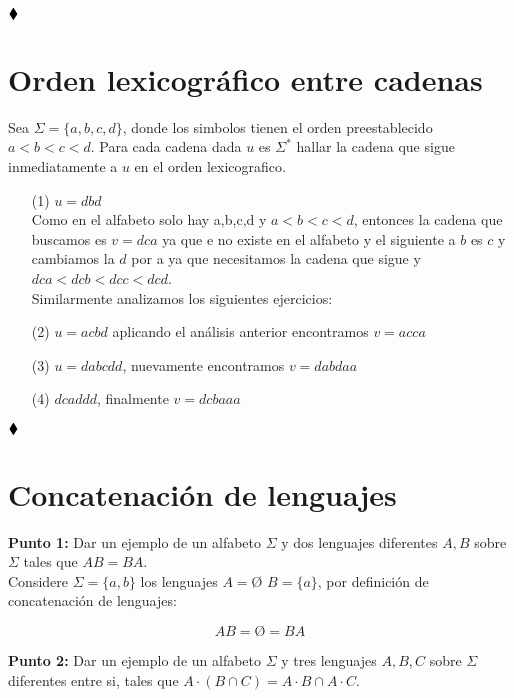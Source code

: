 $\hfill \blacklozenge$

\section{Orden lexicográfico entre cadenas}

Sea $\Sigma=\{a,b,c,d\}$, donde los simbolos tienen el orden preestablecido $a<b<c<d.$ Para cada cadena dada $u$ es $\Sigma^*$ hallar la cadena que sigue inmediatamente a $u$ en el orden lexicografico.

\begin{itemize}
\item[(1)] $u=d b d$\\

Como en el alfabeto solo hay a,b,c,d y $a<b<c<d$, entonces la cadena que buscamos es $v=dca$ ya que e no existe en el alfabeto y el siguiente a $b$ es $c$ y cambiamos la $d$ por a ya que necesitamos la cadena que sigue y $dca<dcb<dcc<dcd$.\\

Similarmente analizamos los siguientes ejercicios:\\

\item[(2)] $u=acbd$ aplicando el análisis anterior encontramos $v=acca$\\

\item[(3)] $u=dabcdd$, nuevamente encontramos $v=dabdaa$\\

\item[(4)] $dcaddd$, finalmente $v=dcbaaa$
\end{itemize}
$\hfill \blacklozenge$

\section{Concatenación de lenguajes} 

\textbf{Punto 1: }Dar un ejemplo de un alfabeto $\Sigma$ y dos lenguajes diferentes $A,B$ sobre $\Sigma$ tales que $AB=BA.$\\ 

Considere $\displaystyle\Sigma=\{a,b\}$ los lenguajes $A=$\O {} $B=\{a\}$, por definición de concatenación de lenguajes:

$$AB=\text{\O}=BA$$

\textbf{Punto 2: }Dar un ejemplo de un alfabeto $\Sigma$ y tres lenguajes $A,B,C$ sobre $\Sigma$ diferentes entre si, tales que $A\cdot(B\cap C)=A\cdot B\cap A\cdot C.$\\

